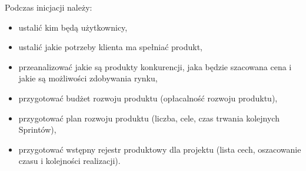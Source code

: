Podczas inicjacji należy:
\begin{itemize}
\item ustalić kim będą użytkownicy,
\item ustalić jakie potrzeby klienta ma spełniać produkt,
\item przeanalizować jakie są produkty konkurencji, jaka będzie szacowana cena i jakie są możliwości zdobywania rynku,
\item przygotować budżet rozwoju produktu (opłacalność rozwoju produktu),
\item przygotować plan rozwoju produktu (liczba, cele, czas trwania kolejnych Sprintów),
\item przygotować wstępny rejestr produktowy dla projektu (lista cech, oszacowanie czasu i kolejności realizacji).
\end{itemize}

